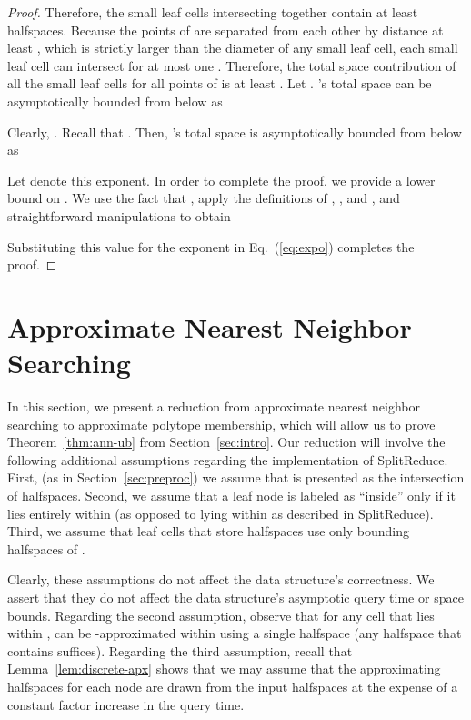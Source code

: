 \documentclass[11pt]{article}   \usepackage[letterpaper,hmargin=2.1cm,vmargin=3cm]{geometry}
\newcommand{\alg}{\textrm{SplitReduce}}
\begin{document}
\begin{proof}
Therefore, the small leaf cells intersecting  together contain at least  halfspaces. Because the points of  are separated from each other by distance at least , which is strictly larger than the diameter of any small leaf cell, each small leaf cell can intersect  for at most one . Therefore, the total space contribution of all the small leaf cells for all points of  is at least . Let . 's total space can be asymptotically bounded from below as

Clearly, . Recall that . Then, 's total space is asymptotically bounded from below as

Let  denote this exponent. In order to complete the proof, we provide a lower bound on . We use the fact that , apply the definitions of , , and , and straightforward manipulations to obtain

Substituting this value for the exponent in Eq.~(\ref{eq:expo}) completes the proof.
\end{proof}


\section{Approximate Nearest Neighbor Searching} \label{sec:ann}


In this section, we present a reduction from approximate nearest neighbor searching to approximate polytope membership, which will allow us to prove Theorem~\ref{thm:ann-ub} from Section~\ref{sec:intro}. Our reduction will involve the following additional assumptions regarding the implementation of {\alg}. First, (as in Section~\ref{sec:preproc}) we assume that  is presented as the intersection of  halfspaces. Second, we assume that a leaf node is labeled as ``inside'' only if it lies entirely within  (as opposed to lying within  as described in {\alg}). Third, we assume that leaf cells that store halfspaces use only bounding halfspaces of .

Clearly, these assumptions do not affect the data structure's correctness. We assert that they do not affect the data structure's asymptotic query time or space bounds. Regarding the second assumption, observe that for any cell  that lies within ,  can be -approximated within  using a single halfspace (any halfspace that contains  suffices). Regarding the third assumption, recall that Lemma~\ref{lem:discrete-apx} shows that we may assume that the approximating halfspaces for each node are drawn from the input halfspaces at the expense of a constant factor increase in the query time.
\end{document}
